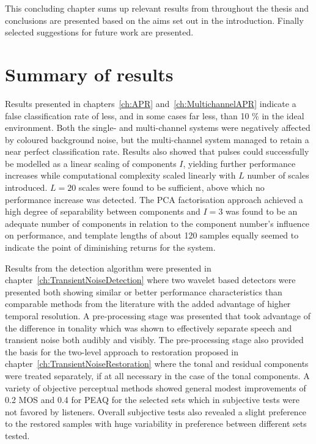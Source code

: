 This concluding chapter sums up relevant results from throughout the thesis and conclusions are presented based on the aims set out in the introduction. Finally selected suggestions for future work are presented.

\section{Summary of results}
Results presented in chapters~\ref{ch:APR} and~\ref{ch:MultichannelAPR} indicate a false classification rate of less, and in some cases far less, than 10 \% in the ideal environment. Both the single- and multi-channel systems were negatively affected by coloured background noise, but the multi-channel system managed to retain a near perfect classification rate. Results also showed that pulses could successfully be modelled as a linear scaling of components $I$, yielding further performance increases while computational complexity scaled linearly with $L$ number of scales introduced. $L=20$ scales were found to be sufficient, above which no performance increase was detected. The PCA factorisation approach achieved a high degree of separability between components and $I=3$ was found to be an adequate number of components in relation to the component number's influence on performance, and template lengths of about 120 samples equally seemed to indicate the point of diminishing returns for the system.

Results from the detection algorithm were presented in chapter~\ref{ch:TransientNoiseDetection} where two wavelet based detectors were presented both showing similar or better performance characteristics than comparable methods from the literature with the added advantage of higher temporal resolution. A pre-processing stage was presented that took advantage of the difference in tonality which was shown to effectively separate speech and transient noise both audibly and visibly. The pre-processing stage also provided the basis for the two-level approach to restoration proposed in chapter~\ref{ch:TransientNoiseRestoration} where the tonal and residual components were treated separately, if at all necessary in the case of the tonal components. A variety of objective perceptual methods showed general modest improvements of 0.2 MOS and 0.4 for PEAQ for the selected sets which in subjective tests were not favored by listeners. Overall subjective tests also revealed a slight preference to the restored samples with huge variability in preference between different sets tested.

